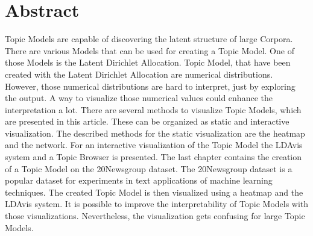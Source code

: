 \chapter{Abstract}
\label{sec:abstract}

Topic Models are capable of discovering the latent structure of large Corpora. There are various Models that can be used for creating a Topic Model. One of those Models is the Latent Dirichlet Allocation. Topic Model, that have been created with the Latent Dirichlet Allocation are numerical distributions. However, those numerical distributions are hard to interpret, just by exploring the output. A way to visualize those numerical values could enhance the interpretation a lot. There are several methods to visualize Topic Models, which are presented in this article. These can be organized as static and interactive visualization. The described methods for the static visualization are the heatmap and the network. For an interactive visualization of the Topic Model the LDAvis system and a Topic Browser is presented. The last chapter contains the creation of a Topic Model on the 20Newsgroup dataset.  The 20Newsgroup dataset is a popular dataset for experiments in text applications of machine learning techniques. The created Topic Model is then visualized using a heatmap and the LDAvis system. It is possible to improve the interpretability of Topic Models with those visualizations. Nevertheless, the visualization gets confusing for large Topic Models.